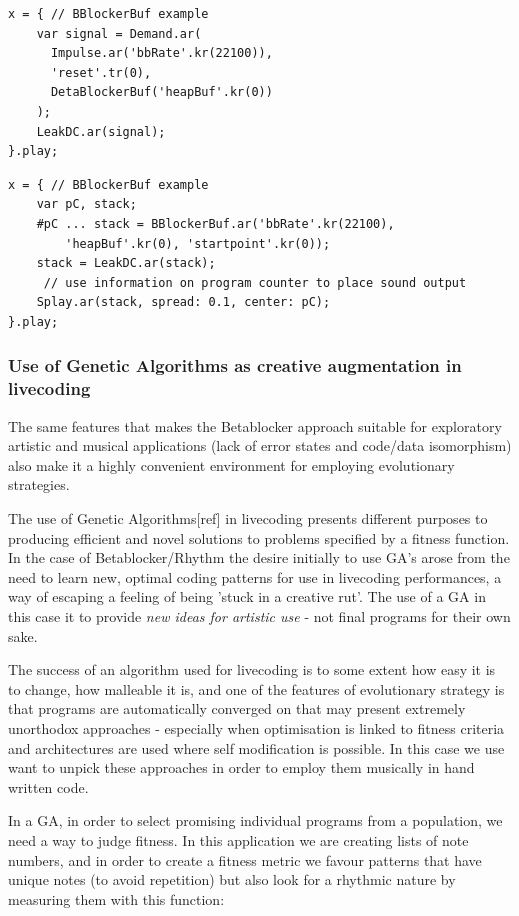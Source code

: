 \documentclass[letterpaper, 12pt]{article}
\begin{document}
\begin{Verbatim}[fontfamily=courier, xleftmargin=\parindent]
x = { // BBlockerBuf example
	var signal = Demand.ar(
	  Impulse.ar('bbRate'.kr(22100)), 
	  'reset'.tr(0),
	  DetaBlockerBuf('heapBuf'.kr(0))
	);
	LeakDC.ar(signal);
}.play;
\end{Verbatim}

\begin{Verbatim}[fontfamily=courier, xleftmargin=\parindent]
x = { // BBlockerBuf example
	var pC, stack;
	#pC ... stack = BBlockerBuf.ar('bbRate'.kr(22100), 
		'heapBuf'.kr(0), 'startpoint'.kr(0));
	stack = LeakDC.ar(stack);
	 // use information on program counter to place sound output
	Splay.ar(stack, spread: 0.1, center: pC);
}.play;
\end{Verbatim}


\subsubsection{Use of Genetic Algorithms as creative augmentation in livecoding} %
\label{sub:genetic_programming}

The same features that makes the Betablocker approach suitable for exploratory artistic and musical applications (lack of error states and code/data isomorphism) also make it a highly convenient environment for employing evolutionary strategies.

The use of Genetic Algorithms[ref] in livecoding presents different purposes to producing efficient and novel solutions to problems specified by a fitness function. In the case of Betablocker/Rhythm the desire initially to use GA's arose from the need to learn new, optimal coding patterns for use in livecoding performances, a way of escaping a feeling of being 'stuck in a creative rut'. The use of a GA in this case it to provide \emph{new ideas for artistic use} - not final programs for their own sake.

The success of an algorithm used for livecoding is to some extent how easy it is to change, how malleable it is, and one of the features of evolutionary strategy is that programs are automatically converged on that may present extremely unorthodox approaches - especially when optimisation is linked to fitness criteria and architectures are used where self modification is possible. In this case we use want to unpick these approaches in order to employ them musically in hand written code.

In a GA, in order to select promising individual programs from a population, we need a way to judge fitness. In this application we are creating lists of note numbers, and in order to create a fitness metric we favour patterns that have unique notes (to avoid repetition) but also look for a rhythmic nature by measuring them with this function:
\end{document}
